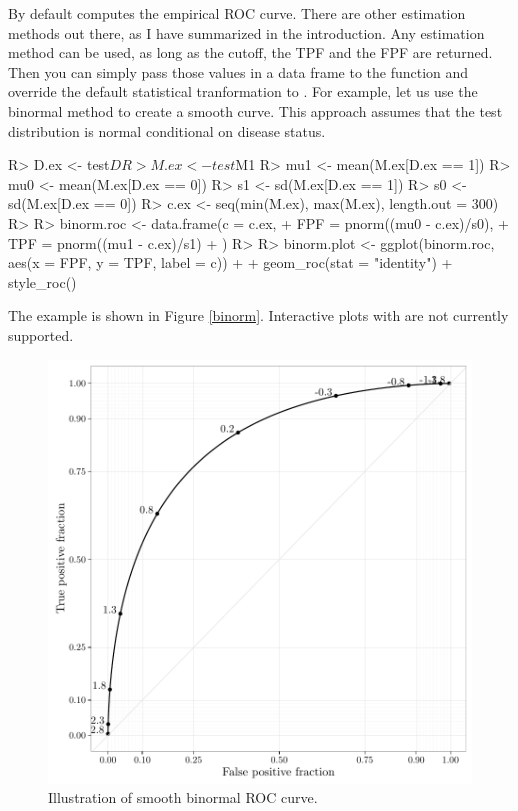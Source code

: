 \documentclass[codesnippet]{jss}
\begin{document}
By default  computes the empirical ROC curve. There
are other estimation methods out there, as I have summarized in the
introduction. Any estimation method can be used, as long as the cutoff,
the TPF and the FPF are returned. Then you can simply pass those values
in a data frame to the  function and override the default
statistical tranformation to . For example, let us
use the binormal method to create a smooth curve. This approach assumes
that the test distribution is normal conditional on disease status.

\begin{Schunk}
\begin{Sinput}
R> D.ex <- test$D
R> M.ex <- test$M1
R> mu1 <- mean(M.ex[D.ex == 1])
R> mu0 <- mean(M.ex[D.ex == 0])
R> s1 <- sd(M.ex[D.ex == 1])
R> s0 <- sd(M.ex[D.ex == 0])
R> c.ex <- seq(min(M.ex), max(M.ex), length.out = 300)
R> 
R> binorm.roc <- data.frame(c = c.ex, 
+                              FPF = pnorm((mu0 - c.ex)/s0), 
+                              TPF = pnorm((mu1 - c.ex)/s1)
+                              )
R> 
R> binorm.plot <- ggplot(binorm.roc, aes(x = FPF, y = TPF, label = c)) + 
+   geom_roc(stat = "identity") + style_roc()
\end{Sinput}
\end{Schunk}

The example is shown in Figure \ref{binorm}. Interactive plots with
 are not currently supported.

\begin{Schunk}
\begin{figure}
\includegraphics{figure/binormal-1} \caption[Illustration of smooth binormal ROC curve]{Illustration of smooth binormal ROC curve. \label{binorm}}\label{fig:binormal}
\end{figure}
\end{Schunk}
\end{document}
